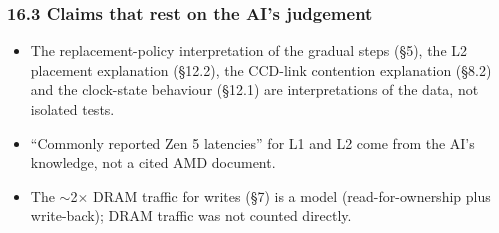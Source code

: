 \documentclass[10pt,letterpaper]{article}
\providecommand{\tightlist}{\setlength{\itemsep}{0pt}\setlength{\parskip}{0pt}}
\begin{document}
\hypertarget{claims-that-rest-on-the-ais-judgement}{%
\subsubsection{16.3 Claims that rest on the AI's
judgement}\label{claims-that-rest-on-the-ais-judgement}}

\begin{itemize}
\tightlist
\item
  The replacement-policy interpretation of the gradual steps
  (§5), the L2 placement explanation (§12.2), the CCD-link
  contention explanation (§8.2) and the clock-state
  behaviour (§12.1) are interpretations of the data, not
  isolated tests.
\item
  ``Commonly reported Zen 5 latencies'' for L1 and L2 come
  from the AI's knowledge, not a cited AMD document.
\item
  The $\sim$2$\times$ DRAM traffic for writes (§7) is a
  model (read-for-ownership plus write-back); DRAM traffic
  was not counted directly.
\end{itemize}
\end{document}
